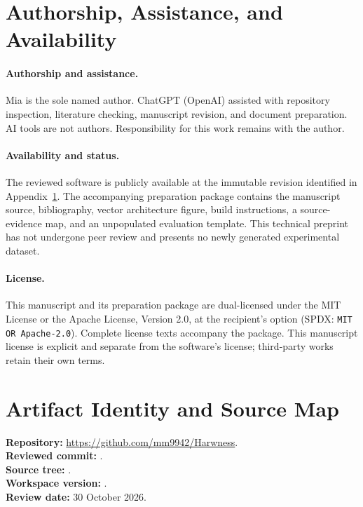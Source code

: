 \section*{Authorship, Assistance, and Availability}
\paragraph{Authorship and assistance.}
Mia is the sole named author. ChatGPT (OpenAI) assisted with repository inspection, literature checking, manuscript revision, and document preparation. AI tools are not authors. Responsibility for this work remains with the author.

\paragraph{Availability and status.}
The reviewed software is publicly available at the immutable revision identified in Appendix~\ref{app:artifact}. The accompanying preparation package contains the manuscript source, bibliography, vector architecture figure, build instructions, a source-evidence map, and an unpopulated evaluation template. This technical preprint has not undergone peer review and presents no newly generated experimental dataset.

\paragraph{License.}
This manuscript and its preparation package are dual-licensed under the MIT License or the Apache License, Version 2.0, at the recipient's option (SPDX: \texttt{MIT OR Apache-2.0}). Complete license texts accompany the package. This manuscript license is explicit and separate from the software's license; third-party works retain their own terms.

\appendix
{}
\section{Artifact Identity and Source Map}
\label{app:artifact}
\noindent\textbf{Repository:} \url{https://github.com/mm9942/Harwness}.\\
\textbf{Reviewed commit:} \texttt{\artifactcommit}.\\
\textbf{Source tree:} \texttt{\artifacttree}.\\
\textbf{Workspace version:} \artifactversion.\\
\textbf{Review date:} 30 October 2026.

